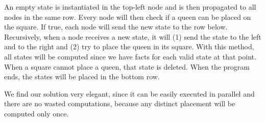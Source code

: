 An empty state is instantiated in the top-left node and is then propagated to all nodes in the same row.
Every node will then check if a queen can be placed on the square. If true, each node will send the new
state to the row below.
Recursively, when a node receives a new state, it will (1) send the state to the left
and to the right and (2) try to place the queen in its square. With this method,
all states will be computed since we have facts for each valid state
at that point. When a square cannot place a queen, that state is deleted.
When the program ends, the states will be placed in the bottom row.

We find our solution very elegant, since it can be easily executed in parallel and there are no
wasted computations, because any distinct placement will be computed only once.

